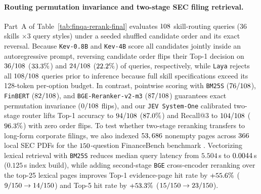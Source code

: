 \paragraph{Routing permutation invariance and two-stage SEC filing retrieval.}
Part~A of Table~\ref{tab:finqa-rerank-final} evaluates $108$ skill-routing queries ($36$ skills $\times 3$ query styles) under a seeded shuffled candidate order and its exact reversal. Because \texttt{Kev-0.8B} and \texttt{Kev-4B} score all candidates jointly inside an autoregressive prompt, reversing candidate order flips their Top-1 decision on $36/108$ ($33.3\%$) and $24/108$ ($22.2\%$) of queries, respectively, while \texttt{Laya} rejects all $108/108$ queries prior to inference because full skill specifications exceed its 128-token per-option budget. In contrast, pointwise scoring with \texttt{BM25S} ($76/108$), \texttt{FinBERT} ($82/108$), and \texttt{BGE-Reranker-v2-m3} ($87/108$) guarantees exact permutation invariance ($0/108$ flips), and our \texttt{JEV System-One} calibrated two-stage router lifts Top-1 accuracy to $94/108$ ($87.0\%$) and Recall@3 to $104/108$ ($96.3\%$) with zero order flips. To test whether two-stage reranking transfers to long-form corporate filings, we also indexed $53,686$ nonempty pages across $366$ local SEC PDFs for the $150$-question FinanceBench benchmark \citep{islam2023financebench}. Vectorizing lexical retrieval with \texttt{BM25S} reduces median query latency from $5.504$\,s to $0.0044$\,s ($0.125$\,s index build), while adding second-stage \texttt{BGE} cross-encoder reranking over the top-25 lexical pages improves Top-1 evidence-page hit rate by $+55.6\%$ ($9/150 \rightarrow 14/150$) and Top-5 hit rate by $+53.3\%$ ($15/150 \rightarrow 23/150$).

